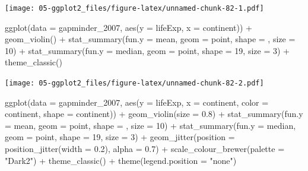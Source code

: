 \documentclass[
]{book}
\newenvironment{Shaded}{\begin{snugshade}}{\end{snugshade}}
\newcommand{\AttributeTok}[1]{\textcolor[rgb]{0.77,0.63,0.00}{#1}}
\newcommand{\DecValTok}[1]{\textcolor[rgb]{0.00,0.00,0.81}{#1}}
\newcommand{\FloatTok}[1]{\textcolor[rgb]{0.00,0.00,0.81}{#1}}
\newcommand{\FunctionTok}[1]{\textcolor[rgb]{0.00,0.00,0.00}{#1}}
\newcommand{\NormalTok}[1]{#1}
\newcommand{\SpecialCharTok}[1]{\textcolor[rgb]{0.00,0.00,0.00}{#1}}
\newcommand{\StringTok}[1]{\textcolor[rgb]{0.31,0.60,0.02}{#1}}
\begin{document}
\texttt{[image: 05-ggplot2\_files/figure-latex/unnamed-chunk-82-1.pdf]}

\begin{Shaded}
\begin{Highlighting}[]


\FunctionTok{ggplot}\NormalTok{(}\AttributeTok{data =}\NormalTok{ gapminder\_2007, }\FunctionTok{aes}\NormalTok{(}\AttributeTok{y =}\NormalTok{ lifeExp, }\AttributeTok{x =}\NormalTok{ continent)) }\SpecialCharTok{+} 
   \FunctionTok{geom\_violin}\NormalTok{() }\SpecialCharTok{+}
   \FunctionTok{stat\_summary}\NormalTok{(}\AttributeTok{fun.y =}\NormalTok{ mean, }\AttributeTok{geom =} \StringTok{\textquotesingle{}point\textquotesingle{}}\NormalTok{, }\AttributeTok{shape =} \StringTok{\textquotesingle{}{-}\textquotesingle{}}\NormalTok{, }\AttributeTok{size =} \DecValTok{10}\NormalTok{) }\SpecialCharTok{+}
   \FunctionTok{stat\_summary}\NormalTok{(}\AttributeTok{fun.y =}\NormalTok{ median, }\AttributeTok{geom =} \StringTok{\textquotesingle{}point\textquotesingle{}}\NormalTok{, }\AttributeTok{shape =} \DecValTok{19}\NormalTok{, }\AttributeTok{size =} \DecValTok{3}\NormalTok{) }\SpecialCharTok{+}
   \FunctionTok{theme\_classic}\NormalTok{()}
\end{Highlighting}
\end{Shaded}

\texttt{[image: 05-ggplot2\_files/figure-latex/unnamed-chunk-82-2.pdf]}

\begin{Shaded}
\begin{Highlighting}[]


\FunctionTok{ggplot}\NormalTok{(}\AttributeTok{data =}\NormalTok{ gapminder\_2007, }
       \FunctionTok{aes}\NormalTok{(}\AttributeTok{y =}\NormalTok{ lifeExp, }\AttributeTok{x =}\NormalTok{ continent, }\AttributeTok{color =}\NormalTok{ continent, }\AttributeTok{shape =}\NormalTok{ continent)) }\SpecialCharTok{+} 
   \FunctionTok{geom\_violin}\NormalTok{(}\AttributeTok{size =} \FloatTok{0.8}\NormalTok{) }\SpecialCharTok{+}
   \FunctionTok{stat\_summary}\NormalTok{(}\AttributeTok{fun.y =}\NormalTok{ mean, }\AttributeTok{geom =} \StringTok{\textquotesingle{}point\textquotesingle{}}\NormalTok{, }\AttributeTok{shape =} \StringTok{\textquotesingle{}{-}\textquotesingle{}}\NormalTok{, }\AttributeTok{size =} \DecValTok{10}\NormalTok{) }\SpecialCharTok{+}
   \FunctionTok{stat\_summary}\NormalTok{(}\AttributeTok{fun.y =}\NormalTok{ median, }\AttributeTok{geom =} \StringTok{\textquotesingle{}point\textquotesingle{}}\NormalTok{, }\AttributeTok{shape =} \DecValTok{19}\NormalTok{, }\AttributeTok{size =} \DecValTok{3}\NormalTok{) }\SpecialCharTok{+}
   \FunctionTok{geom\_jitter}\NormalTok{(}\AttributeTok{position =} \FunctionTok{position\_jitter}\NormalTok{(}\AttributeTok{width =} \FloatTok{0.2}\NormalTok{), }\AttributeTok{alpha =} \FloatTok{0.7}\NormalTok{) }\SpecialCharTok{+}
   \FunctionTok{scale\_colour\_brewer}\NormalTok{(}\AttributeTok{palette =} \StringTok{"Dark2"}\NormalTok{) }\SpecialCharTok{+}
   \FunctionTok{theme\_classic}\NormalTok{() }\SpecialCharTok{+}
   \FunctionTok{theme}\NormalTok{(}\AttributeTok{legend.position =} \StringTok{"none"}\NormalTok{)}
\end{Highlighting}
\end{Shaded}
\end{document}
